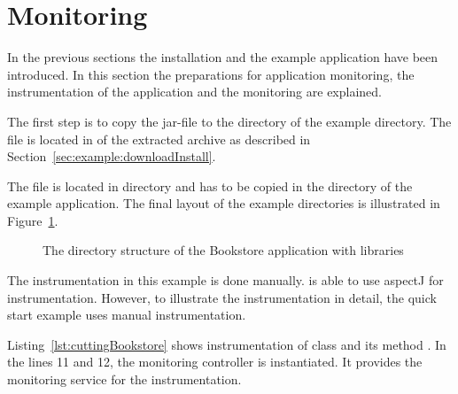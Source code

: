 \section{Monitoring}\label{sec:example:monitoring}

In the previous sections the \Kieker{} installation and the example application have been introduced. In this section the preparations for application monitoring, the instrumentation of the application and the monitoring are explained.

The first step is to copy the \Kieker{} jar-file \file{\mainJar} to the  directory of the example directory. The file is located in  of the extracted \Kieker{} archive as described in Section~\ref{sec:example:downloadInstall}.

The file \file{\commonsLoggingJar} is located in  directory and has to be copied in the  directory of the example application. The final layout of the example directories is illustrated in Figure~\ref{fig:KiekerBookstoreExample}.

\begin{figure}[H]
\begin{graybox}
\end{graybox}
\caption{The directory structure of the Bookstore application with \Kieker{} libraries}
\label{fig:KiekerBookstoreExample}
\end{figure}

\noindent The instrumentation in this example is done manually. \Kieker{} is able to use aspectJ for instrumentation. However, to illustrate the instrumentation in detail, the quick start example uses manual instrumentation.

Listing~\ref{lst:cuttingBookstore} shows instrumentation of  class and its method . In the lines 11 and 12, the monitoring controller is instantiated. It provides the monitoring service for the instrumentation.



